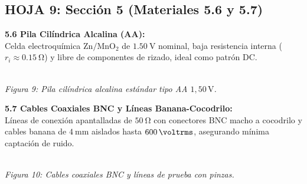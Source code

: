 \documentclass[a4paper, 11pt]{article}
\begin{document}
\newpage

\subsection*{\color{uni-blue} HOJA 9: Sección 5 (Materiales 5.6 y 5.7)}
\begin{tcolorbox}[title=Texto a Escribir: Material 5.6 (Pila Alcalina AA), colframe=black]
    \small
    \textbf{5.6 Pila Cilíndrica Alcalina (AA):}\\[0.15cm]
    Celda electroquímica $\text{Zn}/\text{MnO}_2$ de $\qty{1,50}{\volt}$ nominal, baja resistencia interna ($r_i \approx \qty{0,15}{\ohm}$) y libre de componentes de rizado, ideal como patrón DC.\\[0.2cm]
    \begin{center}
        \\[0.1cm]
        {\scriptsize\textit{Figura 9: Pila cilíndrica alcalina estándar tipo AA $1{,}50\,\text{V}$.}}
    \end{center}
\end{tcolorbox}

\vspace{0.2cm}

\begin{tcolorbox}[title=Texto a Escribir: Material 5.7 (Cables Coaxiales BNC y Sondas), colframe=black]
    \small
    \textbf{5.7 Cables Coaxiales BNC y Líneas Banana-Cocodrilo:}\\[0.15cm]
    Líneas de conexión apantalladas de $\qty{50}{\ohm}$ con conectores BNC macho a cocodrilo y cables banana de $\qty{4}{\milli\meter}$ aislados hasta $\qty{600}{\voltrms}$, asegurando mínima captación de ruido.\\[0.2cm]
    \begin{center}
        \\[0.1cm]
        {\scriptsize\textit{Figura 10: Cables coaxiales BNC y líneas de prueba con pinzas.}}
    \end{center}
\end{tcolorbox}
\end{document}
